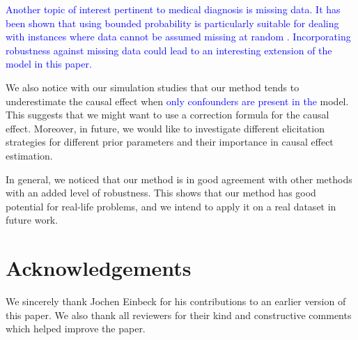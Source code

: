 \documentclass[preprint,12pt]{elsarticle}
\newcommand{\added}[1]{\textcolor{blue}{#1}}
\begin{document}
\added{%
Another topic of interest pertinent to medical diagnosis is missing data.
It has been shown that using bounded probability is particularly suitable
for dealing with instances where data cannot be assumed missing at random
\citep{decoomanzaffalon2004}.
Incorporating robustness against missing data could lead to an interesting
extension of the model in this paper.%
}

We also notice with our simulation studies that our
method tends to underestimate the causal effect
when \added{only confounders are present in the}
model. This suggests that we might want
to use a correction formula for the causal effect.
Moreover, in future, we would
like to investigate different elicitation strategies for different prior parameters and their importance in causal effect estimation. 


In general, we noticed that our method
is in good agreement with other methods with an added level of robustness.
This shows that our method has good potential for real-life problems,
and we intend to apply it on a real dataset in future work.

\section*{Acknowledgements}

We sincerely thank Jochen Einbeck for his contributions to an earlier version of this paper.
We also thank all reviewers for their kind and constructive comments which helped improve the paper.

 

\end{document}
